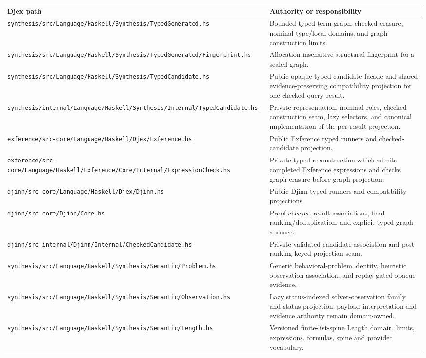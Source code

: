 \documentclass[10pt,letterpaper,oneside]{report}
\newcommand{\filepath}[1]{\nolinkurl{#1}}
\begin{document}
\begin{longtable}{@{}L{0.43\textwidth}L{0.53\textwidth}@{}}
\toprule
\textbf{Djex path} & \textbf{Authority or responsibility} \\
\midrule
\endhead
\filepath{synthesis/src/Language/Haskell/Synthesis/TypedGenerated.hs} & Bounded typed term graph, checked erasure, nominal type/local domains, and graph construction limits. \\
\filepath{synthesis/src/Language/Haskell/Synthesis/TypedGenerated/Fingerprint.hs} & Allocation-insensitive structural fingerprint for a sealed graph. \\
\filepath{synthesis/src/Language/Haskell/Synthesis/TypedCandidate.hs} & Public opaque typed-candidate facade and shared evidence-preserving compatibility projection for one checked query result. \\
\filepath{synthesis/internal/Language/Haskell/Synthesis/Internal/TypedCandidate.hs} & Private representation, nominal roles, checked construction seam, lazy selectors, and canonical implementation of the per-result projection. \\
\filepath{exference/src-core/Language/Haskell/Djex/Exference.hs} & Public Exference typed runners and checked-candidate projection. \\
\filepath{exference/src-core/Language/Haskell/Exference/Core/Internal/ExpressionCheck.hs} & Private typed reconstruction which admits completed Exference expressions and checks graph erasure before graph projection. \\
\filepath{djinn/src-core/Language/Haskell/Djex/Djinn.hs} & Public Djinn typed runners and compatibility projections. \\
\filepath{djinn/src-core/Djinn/Core.hs} & Proof-checked result associations, final ranking/deduplication, and explicit typed graph absence. \\
\filepath{djinn/src-internal/Djinn/Internal/CheckedCandidate.hs} & Private validated-candidate association and post-ranking keyed projection seam. \\
\filepath{synthesis/src/Language/Haskell/Synthesis/Semantic/Problem.hs} & Generic behavioral-problem identity, heuristic observation association, and replay-gated opaque evidence. \\
\filepath{synthesis/src/Language/Haskell/Synthesis/Semantic/Observation.hs} & Lazy status-indexed solver-observation family and status projection; payload interpretation and evidence authority remain domain-owned. \\
\filepath{synthesis/src/Language/Haskell/Synthesis/Semantic/Length.hs} & Versioned finite-list-spine Length domain, limits, expressions, formulas, spine and provider vocabulary. \\

\end{longtable}
\end{document}
